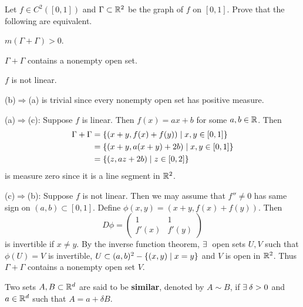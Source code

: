 \begin{problem}
    Let $f\in C^2([0,1])$ and $\Gamma\subset\mathbb{R}^2$ be the graph 
    of $f$ on $[0,1]$. Prove that the following are equivalent. 
    \begin{thmenum}
        \item $m(\Gamma + \Gamma) > 0$. 
        \item $\Gamma + \Gamma$ contains a nonempty open set. 
        \item $f$ is not linear.
    \end{thmenum}
\end{problem}
\begin{pf}
    (b)$\Rightarrow$(a) is trivial since every nonempty open 
    set has positive measure. 

    (a)$\Rightarrow$(c): Suppose $f$ is linear. Then $f(x) = 
    ax+b$ for some $a,b\in\mathbb{R}$. Then
    \begin{equation*}
        \begin{split}
            \Gamma+\Gamma 
            &= \left\{ (x+y,f(x)+f(y)) \;\middle\vert\; x,y\in[0,1] \right\}\\ 
            &= \left\{ (x+y,a(x+y)+2b) \;\middle\vert\; x,y\in[0,1] \right\}\\ 
            &= \left\{ (z,az+2b) \;\middle\vert\; z\in[0,2] \right\}
        \end{split}
    \end{equation*}
    is measure zero 
    since it is a line segment in $\mathbb{R}^2$. 

    (c)$\Rightarrow$(b): Suppose $f$ is not linear. Then we 
    may assume that $f''\neq 0$ has same sign on $(a,b)
    \subset[0,1]$. Define $\phi(x,y) = (x+y,f(x)+f(y))$. Then 
    \[
        D\phi = \begin{pmatrix}
            1 & 1\\ 
            f'(x) & f'(y)
        \end{pmatrix}
    \]
    is invertible if $x\neq y$. By the inverse function 
    theorem, $\exists\:$ open sets $U,V$ such that $\phi(U) = V$ 
    is invertible, $U\subset(a,b)^2-\left\{ (x,y) \;\middle\vert\; x=y \right\}$ and $V$ 
    is open in $\mathbb{R}^2$. Thus $\Gamma+\Gamma$ contains a nonempty 
    open set $V$.
\end{pf}

\begin{definition*}
    Two sets $A,B\subset\mathbb{R}^d$ are said to be \textbf{similar}, 
    denoted by $A\sim B$, if $\exists\: \delta>0$ and $a\in\mathbb{R}^d$ 
    such that $A = a+\delta B$.
\end{definition*}

